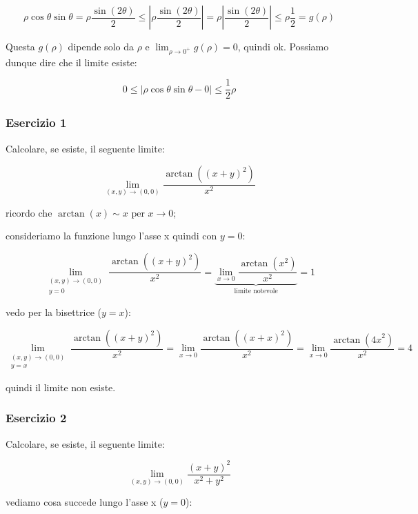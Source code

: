 \[
    \rho\cos\theta\sin\theta = \rho\frac{\sin(2\theta)}{2} \le \left|\rho\frac{\sin(2\theta)}{2}\right| = \rho\left|\frac{\sin(2\theta)}{2}\right| \le \rho{\frac{1}{2}} = g(\rho)
\]

Questa \(g(\rho)\) dipende solo da \(\rho \) e \(\lim_{\rho \to 0^+} g(\rho) = 0\), quindi ok. Possiamo dunque dire che il limite esiste:

\[
    0 \le \left| \rho\cos\theta \sin\theta  -0 \right| \le \frac{1}{2}\rho
\]

\filbreak{}
\subsubsection*{Esercizio 1}

Calcolare, se esiste, il seguente limite:

\[
    \lim_{ (x,y) \to (0,0) } \frac{\arctan\left({(x+y)}^{2}\right)}{x^{2}}
\]

ricordo che \(\arctan(x) \sim x \text{ per } x\to0\);

consideriamo la funzione lungo l'asse x quindi con \(y=0\):

\[
    \lim_{ \begin{smallmatrix}(x,y) \to (0,0) \\ y=0\end{smallmatrix} } \frac{\arctan\left({(x+y)}^{2}\right)}{x^{2}}= \underbrace{\lim_{ x \to 0 } \frac{\arctan\left(x^{2}\right) }{x^{2}}}_{\text{limite notevole}} = 1
\]

vedo per la bisettrice (\(y=x\)):

\[
    \lim_{ \begin{smallmatrix}(x,y) \to (0,0) \\ y=x\end{smallmatrix} } \frac{\arctan\left({(x+y)}^{2}\right)}{x^{2}} =  \lim_{ x \to 0 } \frac{\arctan\left({(x+x)}^{2}\right)}{x^{2}} =  \lim_{ x \to 0 } \frac{\arctan\left({4x}^{2}\right)}{x^{2}} = 4
\]

quindi il limite non esiste.

\filbreak{}
\subsubsection*{Esercizio 2}

Calcolare, se esiste, il seguente limite:

\[
    \lim_{ (x,y) \to (0,0) } \frac{{(x+y)}^{2}}{x^{2}+y^{2}}
\]

vediamo cosa succede lungo l'asse x (\(y=0\)):

